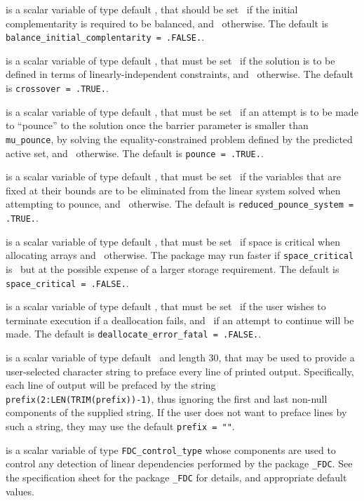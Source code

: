 \begin{description}
 is a scalar variable of type 
default \logical, that should be set \true\
if the initial complementarity is required to be balanced,
and \false\ otherwise.
The default is {\tt balance\_initial\_complentarity = .FALSE.}.

 is a scalar variable of type default \logical,
that must be set \true\ if the solution is to be defined in terms
of linearly-independent constraints,
and  \false\ otherwise.
The default is {\tt crossover = .TRUE.}.

 is a scalar variable of type default \logical,
that must be set \true\ if an attempt is to be made to ``pounce'' to the
solution once the barrier parameter is smaller than {\tt mu\_pounce},
by solving the equality-constrained problem defined by the predicted
active set, and \false\ otherwise.
The default is {\tt pounce = .TRUE.}.

 is a scalar variable of type default \logical,
that must be set \true\ if the variables that are fixed at their bounds
are to be eliminated from the linear system solved when attempting to
pounce, and \false\ otherwise.
The default is {\tt reduced\_pounce\_system = .TRUE.}.

 is a scalar variable of type default \logical,
that must be set \true\ if space is critical when allocating arrays
and  \false\ otherwise. The package may run faster if
{\tt space\_critical} is \false\ but at the possible expense of a larger
storage requirement. The default is {\tt space\_critical = .FALSE.}.

 is a scalar variable of type default \logical,
that must be set \true\ if the user wishes to terminate execution if
a deallocation  fails, and \false\ if an attempt to continue
will be made. The default is {\tt deallocate\_error\_fatal = .FALSE.}.

 is a scalar variable of type default \character\
and length 30, that may be used to provide a user-selected
character string to preface every line of printed output.
Specifically, each line of output will be prefaced by the string
{\tt prefix(2:LEN(TRIM(prefix))-1)},
thus ignoring the first and last non-null components of the
supplied string. If the user does not want to preface lines by such
a string, they may use the default {\tt prefix = ""}.

 is a scalar variable of type
{\tt FDC\_control\_type}
whose components are used to control any detection of linear dependencies
performed by the package
{\tt \libraryname\_FDC}.
See the specification sheet for the package
{\tt \libraryname\_FDC}
for details, and appropriate default values.


\end{description}
